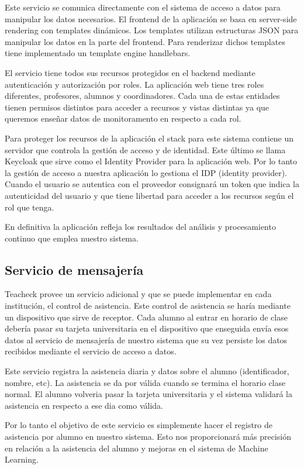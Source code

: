 Este servicio se comunica directamente con el sistema de acceso a
datos para manipular los datos necesarios. El frontend de la
aplicación se basa en server-side rendering con templates
dinámicos. Los templates utilizan estructuras JSON para manipular los
datos en la parte del frontend. Para renderizar dichos templates tiene
implementado un template engine handlebars.

El servicio tiene todos sus recursos protegidos en el backend mediante
autenticación y autorización por roles. La aplicación web tiene tres
roles diferentes, profesores, alumnos y coordinadores. Cada una de
estas entidades tienen permisos distintos para acceder a recursos y
vistas distintas ya que queremos enseñar datos de monitoramento en
respecto a cada rol.

Para proteger los recursos de la aplicación el stack para este sistema
contiene un servidor que controla la gestión de acceso y de
identidad. Este último se llama Keycloak que sirve como el Identity
Provider para la aplicación web. Por lo tanto la gestión de acceso a
nuestra aplicación lo gestiona el IDP (identity provider). Cuando el
usuario se autentica con el proveedor consignará un token que indica
la autenticidad del usuario y que tiene libertad para acceder a los
recursos según el rol que tenga.

En definitiva la aplicación refleja los resultados del análisis y
procesamiento continuo que emplea nuestro sistema.

\subsection{Servicio de mensajería}

Teacheck provee un servicio adicional y que se puede implementar en
cada institución, el control de asistencia. Este control de asistencia
se haría mediante un dispositivo que sirve de receptor. Cada alumno al
entrar en horario de clase debería pasar su tarjeta universitaria en
el dispositivo que enseguida envía esos datos al servicio de
mensajería de nuestro sistema que su vez persiste los datos recibidos
mediante el servicio de acceso a datos.

Este servicio registra la asistencia diaria y datos sobre el alumno
(identificador, nombre, etc).  La asistencia se da por válida cuando
se termina el horario clase normal. El alumno volveria pasar la
tarjeta universitaria y el sistema validará la asistencia en respecto
a ese dia como válida.

Por lo tanto el objetivo de este servicio es simplemente hacer el
registro de asistencia por alumno en nuestro sistema. Esto nos
proporcionará más precisión en relación a la asistencia del alumno y
mejoras en el sistema de Machine Learning.

